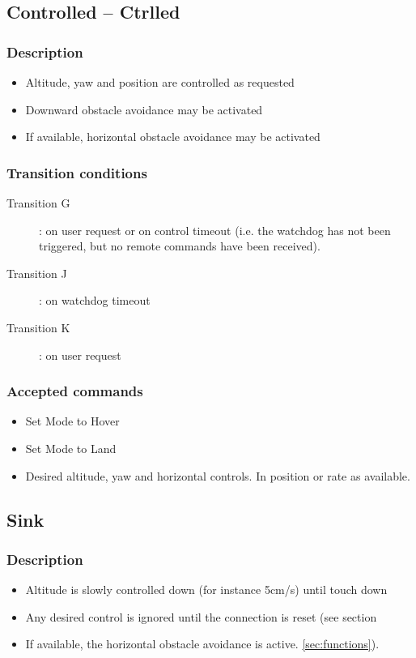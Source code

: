 \documentclass{article}
\begin{document}
\subsection{Controlled -- Ctrlled}
\subsubsection{Description}
\begin{itemize}
\item Altitude, yaw and position are controlled as requested
\item Downward obstacle avoidance may be activated
\item If available, horizontal obstacle avoidance may be activated
\end{itemize}
\subsubsection{Transition conditions}
\begin{description}
\item[Transition G]: on user request or on control timeout (i.e. the watchdog
has not been triggered, but no remote commands have been received).
\item[Transition J]: on watchdog timeout 
\item[Transition K]: on user request
\end{description}
\subsubsection{Accepted commands}
\begin{itemize}
\item Set Mode to Hover
\item Set Mode to Land
\item Desired altitude, yaw and horizontal controls. In position or rate as
available. 
\end{itemize}

\subsection{Sink}
\subsubsection{Description}
\begin{itemize}
\item Altitude is slowly controlled down (for instance 5cm/s) until touch down
\item Any desired control is ignored until the connection is reset (see section
\item If available, the horizontal obstacle avoidance is active.
\ref{sec:functions}).
\end{itemize}
\end{document}
